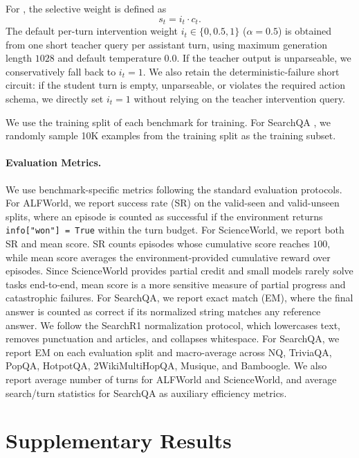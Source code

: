For \ours{}, the selective weight is defined as
\begin{equation}
    s_t = i_t \cdot c_t.
\end{equation}
The default per-turn intervention weight $i_t \in \{0,0.5,1\}$ ($\alpha=0.5$) is obtained from one short teacher query per assistant turn, using maximum generation length $1028$ and default temperature $0.0$. If the teacher output is unparseable, we conservatively fall back to $i_t=1$. We also retain the deterministic-failure short circuit: if the student turn is empty, unparseable, or violates the required action schema, we directly set $i_t=1$ without relying on the teacher intervention query.

We use the training split of each benchmark for training. For SearchQA \citep{jin2025search}, we randomly sample 10K examples from the training split as the training subset.

\paragraph{Evaluation Metrics.}
We use benchmark-specific metrics following the standard evaluation protocols.
%
For ALFWorld, we report success rate (SR) on the valid-seen and valid-unseen splits, where an episode is counted as successful if the environment returns \texttt{info["won"] = True} within the turn budget.
%
For ScienceWorld, we report both SR and mean score.
%
SR counts episodes whose cumulative score reaches $100$, while mean score averages the environment-provided cumulative reward over episodes.
%
Since ScienceWorld provides partial credit and small models rarely solve tasks end-to-end, mean score is a more sensitive measure of partial progress and catastrophic failures.
%
For SearchQA, we report exact match (EM), where the final answer is counted as correct if its normalized string matches any reference answer.
%
We follow the SearchR1 normalization protocol, which lowercases text, removes punctuation and articles, and collapses whitespace.
%
For SearchQA, we report EM on each evaluation split and macro-average across NQ, TriviaQA, PopQA, HotpotQA, 2WikiMultiHopQA, Musique, and Bamboogle.
%
We also report average number of turns for ALFWorld and ScienceWorld, and average search/turn statistics for SearchQA as auxiliary efficiency metrics.


\section{Supplementary Results}
\label{sec:supplementary_results}

